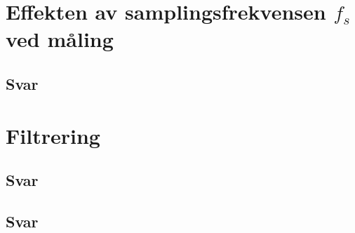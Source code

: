 \documentclass[answers,11pt]{exam}
\begin{document}
\begin{enumerate}[a)]
\begin{tcolorbox}
    
  \end{tcolorbox}



  

  \newpage

  \label{side:2}
  \section*{Effekten av samplingsfrekvensen $f_{s}$ ved måling}

    

  \begin{tcolorbox}
    \subsection*{Svar}
    
    
  \end{tcolorbox}





  
  \newpage

  \section*{Filtrering}
  \label{side:3}
    

  \begin{tcolorbox}
    \subsection*{Svar}
    
    
  \end{tcolorbox}




  
  \newpage
    

  \begin{tcolorbox}
    \subsection*{Svar}
    

\end{tcolorbox}
\end{enumerate}
\end{document}
